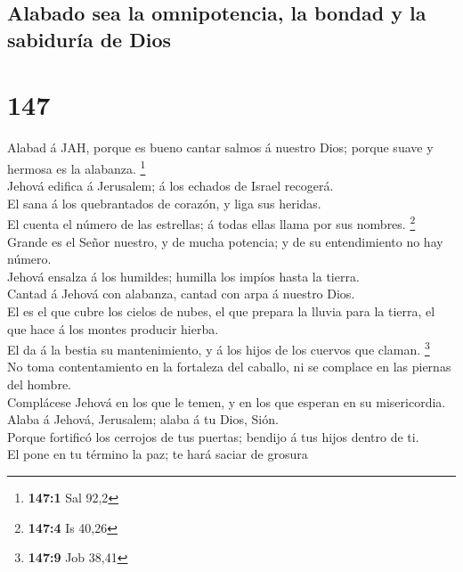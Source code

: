 \hypertarget{alabado-sea-la-omnipotencia-la-bondad-y-la-sabiduruxeda-de-dios}{%
\subsection{Alabado sea la omnipotencia, la bondad y la sabiduría de
Dios}\label{alabado-sea-la-omnipotencia-la-bondad-y-la-sabiduruxeda-de-dios}}

\hypertarget{section-146}{%
\section{147}\label{section-146}}

 Alabad á JAH, porque es bueno cantar salmos á nuestro
Dios; porque suave y hermosa es la alabanza. \footnote{\textbf{147:1}
  Sal 92,2}\\
 Jehová edifica á Jerusalem; á los echados de Israel
recogerá.\\
 El sana á los quebrantados de corazón, y liga sus
heridas.\\
 El cuenta el número de las estrellas; á todas ellas llama
por sus nombres. \footnote{\textbf{147:4} Is 40,26}\\
 Grande es el Señor nuestro, y de mucha potencia; y de su
entendimiento no hay número.\\
 Jehová ensalza á los humildes; humilla los impíos hasta
la tierra.\\
 Cantad á Jehová con alabanza, cantad con arpa á nuestro
Dios.\\
 El es el que cubre los cielos de nubes, el que prepara la
lluvia para la tierra, el que hace á los montes producir hierba.\\
 El da á la bestia su mantenimiento, y á los hijos de los
cuervos que claman. \footnote{\textbf{147:9} Job 38,41}\\
 No toma contentamiento en la fortaleza del caballo, ni
se complace en las piernas del hombre.\\
 Complácese Jehová en los que le temen, y en los que
esperan en su misericordia.\\
 Alaba á Jehová, Jerusalem; alaba á tu Dios, Sión.\\
 Porque fortificó los cerrojos de tus puertas; bendijo á
tus hijos dentro de ti.\\
 El pone en tu término la paz; te hará saciar de grosura
